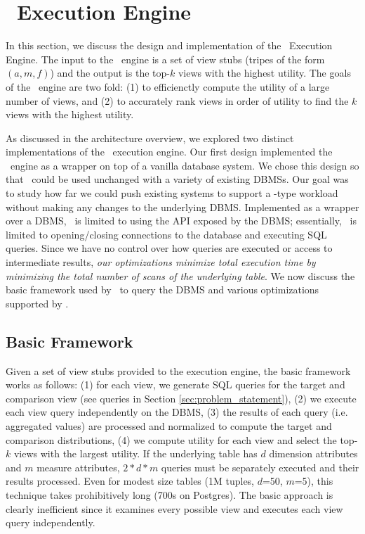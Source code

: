 \section{\VizRecDB\ Execution Engine}
In this section, we discuss the design and implementation of the \VizRecDB\
Execution Engine. 
The input to the \VizRecDB\ engine is a set of view stubs (tripes of the form
$(a, m, f)$) and the output is the top-$k$ views with the highest utility.
The goals of the \VizRecDB\ engine are two fold:
(1) to efficienctly compute the utility of a large number of views, and (2) to accurately rank views in order of
utility to find the $k$ views with the highest utility.


As discussed in the architecture overview, we explored two distinct
implementations of the \VizRecDB\ execution engine.
Our first design implemented the \VizRecDB\ engine as a wrapper on top of a
vanilla database system.
We chose this design so that \VizRecDB\ could be used unchanged with a variety of
existing DBMSs.
Our goal was to study how far we could push existing systems to
support a \VizRecDB-type workload without making any changes to the underlying
DBMS.
Implemented as a wrapper over a DBMS, \VizRecDB\ is limited to using the API
exposed by the DBMS; essentially, \VizRecDB\ is limited to opening/closing connections to the
database and executing SQL queries. 
Since we have no control over how queries are executed or access to intermediate
results, {\it our optimizations minimize total execution time by minimizing the
total number of scans of the underlying table}.
We now discuss the basic framework used by \VizRecDB\ to query the DBMS and various
optimizations supported by \VizRecDB.

\subsection{Basic Framework}
\label{sec:basic_framework}
Given a set of view stubs provided to the execution engine, the basic framework
works as follows: 
(1) for each view, we generate SQL queries for the target and
comparison view (see queries in Section \ref{sec:problem_statement}), 
(2) we execute each view query independently on the DBMS, 
(3) the results of each query (i.e. aggregated values) are processed and
normalized to compute the target and comparison distributions, 
(4) we compute utility for each view and select the top-$k$ views with the largest utility.
If the underlying table has $d$ dimension attributes and $m$ measure attributes,
$2\ast d \ast m$ queries must be separately executed and their results
processed. Even for modest size tables (1M tuples, $d$=50, $m$=5), this
technique takes prohibitively long (700s on Postgres). The basic approach is
clearly inefficient since it examines every possible view and executes each view
query independently.

